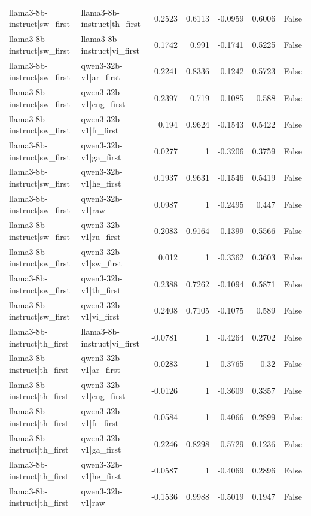 \begin{table}
\begin{tabular}{l l r r r r l}
llama3-8b-instruct|sw_first & llama3-8b-instruct|th_first & 0.2523 & 0.6113 & -0.0959 & 0.6006 & False \\
llama3-8b-instruct|sw_first & llama3-8b-instruct|vi_first & 0.1742 & 0.991 & -0.1741 & 0.5225 & False \\
llama3-8b-instruct|sw_first & qwen3-32b-v1|ar_first & 0.2241 & 0.8336 & -0.1242 & 0.5723 & False \\
llama3-8b-instruct|sw_first & qwen3-32b-v1|eng_first & 0.2397 & 0.719 & -0.1085 & 0.588 & False \\
llama3-8b-instruct|sw_first & qwen3-32b-v1|fr_first & 0.194 & 0.9624 & -0.1543 & 0.5422 & False \\
llama3-8b-instruct|sw_first & qwen3-32b-v1|ga_first & 0.0277 & 1 & -0.3206 & 0.3759 & False \\
llama3-8b-instruct|sw_first & qwen3-32b-v1|he_first & 0.1937 & 0.9631 & -0.1546 & 0.5419 & False \\
llama3-8b-instruct|sw_first & qwen3-32b-v1|raw & 0.0987 & 1 & -0.2495 & 0.447 & False \\
llama3-8b-instruct|sw_first & qwen3-32b-v1|ru_first & 0.2083 & 0.9164 & -0.1399 & 0.5566 & False \\
llama3-8b-instruct|sw_first & qwen3-32b-v1|sw_first & 0.012 & 1 & -0.3362 & 0.3603 & False \\
llama3-8b-instruct|sw_first & qwen3-32b-v1|th_first & 0.2388 & 0.7262 & -0.1094 & 0.5871 & False \\
llama3-8b-instruct|sw_first & qwen3-32b-v1|vi_first & 0.2408 & 0.7105 & -0.1075 & 0.589 & False \\
llama3-8b-instruct|th_first & llama3-8b-instruct|vi_first & -0.0781 & 1 & -0.4264 & 0.2702 & False \\
llama3-8b-instruct|th_first & qwen3-32b-v1|ar_first & -0.0283 & 1 & -0.3765 & 0.32 & False \\
llama3-8b-instruct|th_first & qwen3-32b-v1|eng_first & -0.0126 & 1 & -0.3609 & 0.3357 & False \\
llama3-8b-instruct|th_first & qwen3-32b-v1|fr_first & -0.0584 & 1 & -0.4066 & 0.2899 & False \\
llama3-8b-instruct|th_first & qwen3-32b-v1|ga_first & -0.2246 & 0.8298 & -0.5729 & 0.1236 & False \\
llama3-8b-instruct|th_first & qwen3-32b-v1|he_first & -0.0587 & 1 & -0.4069 & 0.2896 & False \\
llama3-8b-instruct|th_first & qwen3-32b-v1|raw & -0.1536 & 0.9988 & -0.5019 & 0.1947 & False \\

\end{tabular}
\end{table}
